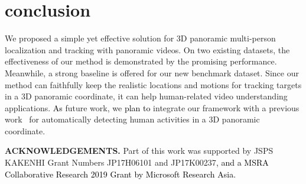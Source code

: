 \documentclass{article}
\newcommand{\YangProof}[1]{\textcolor{black}{#1}}
\begin{document}
\section{conclusion}
We proposed a simple yet effective solution for 3D panoramic multi-person localization and tracking with panoramic videos. On two existing datasets, the effectiveness of our method is demonstrated by the promising performance. Meanwhile, a strong baseline is offered for our new benchmark dataset. Since our method can faithfully keep the realistic locations and motions for tracking targets in a 3D panoramic coordinate, it can help human-related video understanding applications. \YangProof{As} future work, we \YangProof{plan to} integrate our framework with a previous work~\cite{yang2019framework} for automatically detecting human activities in a 3D panoramic coordinate.


\noindent \textbf{ACKNOWLEDGEMENTS.}
Part of this work was supported by JSPS KAKENHI Grant Numbers JP17H06101 and JP17K00237\YangProof{, and a MSRA Collaborative Research 2019 Grant by Microsoft Research Asia.}





{\small}
\end{document}
